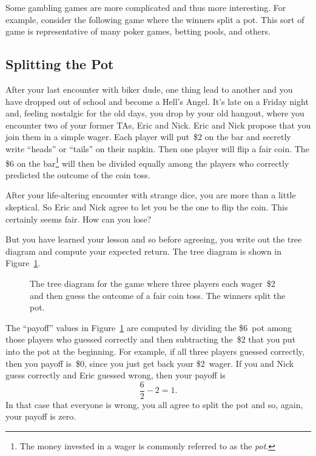 Some gambling games are more complicated and thus more interesting.
For example, consider the following game where the winners split a
pot.  This sort of game is representative of many poker games, betting
pools, and others.

\subsection{Splitting the Pot}

After your last encounter with biker dude, one thing lead to another
and you have dropped out of school and become a Hell's Angel.  It's
late on a Friday night and, feeling nostalgic for the old days, you
drop by your old hangout, where you encounter two of your former TAs,
Eric and Nick.  Eric and Nick propose that you join them in a simple
wager. Each player will put~\$2 on the bar and secretly write
``heads'' or ``tails'' on their napkin.  Then one player will flip a
fair coin.   The \$6 on the bar\footnote{The money invested in a wager
  is commonly referred to as the \emph{pot}.} will then be divided
equally among the players who correctly predicted the outcome of the
coin toss.

After your life-altering encounter with strange dice, you are more
than a little skeptical.  So Eric and Nick agree to let you be the one
to flip the coin.  This certainly seems fair.  How can you lose?

But you have learned your lesson and so before agreeing, you write out
the tree diagram and compute your expected return.  The tree diagram
is shown in Figure~\ref{fig:17E1}.

\begin{figure}



\caption{The tree diagram for the game where three players each
  wager~\$2 and then guess the outcome of a fair coin toss.  The
  winners split the pot.}

\label{fig:17E1}

\end{figure}

The ``payoff'' values in Figure~\ref{fig:17E1} are computed by
dividing the \$6~pot among those players who guessed correctly and
then subtracting the~\$2 that you put into the pot at the beginning.
For example, if all three players guessed correctly, then you payoff
is~\$0, since you just get back your \$2~wager.  If you and Nick guess
correctly and Eric guessed wrong, then your payoff is
\begin{equation*}
    \frac{6}{2} - 2 = 1.
\end{equation*}
In that case that everyone is wrong, you all agree to split the pot
and so, again, your payoff is zero.

